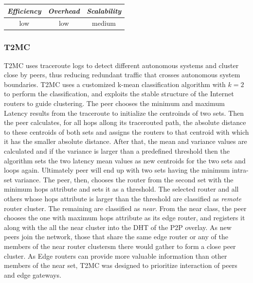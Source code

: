 \begin{center}
\begin{tabular}{ccc}
\emph{Efficiency} & \emph{Overhead} & \emph{Scalability} \\
\hline
low &
%
low &
%
medium
\end{tabular}
\end{center}

\subsubsection{T2MC}
T2MC \cite{shi_t2mc_2008} uses traceroute logs to detect different autonomous
systems and cluster close by peers, thus reducing redundant traffic that crosses
autonomous system boundaries. T2MC uses a customized k-mean classification
algorithm with $k=2$ to perform the classification, and exploits the stable
structure of the Internet routers to guide clustering. The peer chooses the
minimum and maximum Latency results from the traceroute to initialize the
centroinds of two sets. Then the peer calculates, for all hops allong its
tracerouted path, the absolute distance to these centroids of both sets and
assigns the routers to that centroid with which it has the smaller absolute
distance. After that, the mean and variance values are calculated and if the
variance is larger than a predefined threshold then the algorithm sets the two
latency mean values as new centroids for the two sets and loops again.
Ultimately peer will end up with two sets having the minimum intra-set variance.
The peer, then, chooses the router from the second set with the minimum hops
attribute and sets it as a threshold. The selected router and all others whose
hops attribute is larger than the threshold are classified as \emph{remote}
router cluster. The remaining are classified as \emph{near}. From the near
class, the peer chooses the one with maximum hops attribute as its edge router,
and registers it along with the all the near cluster into the DHT of the P2P
overlay. As new peers join the network, those that share the same edge router
or any of the members of the near router clustersm there would gather to form a
close peer cluster. As Edge routers can provide more valuable information than
other members of the near set, T2MC was designed to prioritize interaction of
peers and edge gateways.

%
%
%


